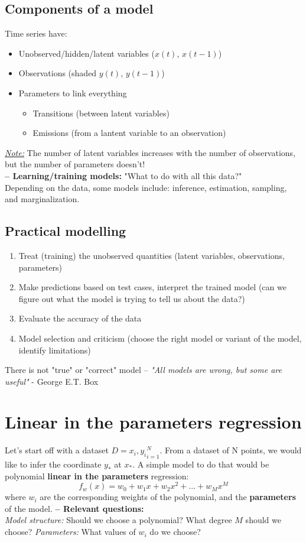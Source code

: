 \documentclass[a4paper,11pt]{article}
\begin{document}
	\subsection{Components of a model}
	Time series have: 
	\begin{itemize}
		\item Unobserved/hidden/latent variables ($x(t)$, $x(t-1)$)
		\item Observations (shaded $y(t)$, $y(t-1)$)
		\item Parameters to link everything 
		\begin{itemize}
			\item Transitions (between latent variables)
			\item Emissions (from a lantent variable to an observation)
		\end{itemize}
	\end{itemize}
	\underline{\emph{Note:}} The number of latent variables increases with the number of observations, but the number of parameters doesn't!\\
	\textbf{-- Learning/training models:} "What to do with all this data?"\\ Depending on the data, some models include: inference, estimation, sampling, and marginalization.
	\subsection{Practical modelling}
	\begin{enumerate}
		\item Treat (training) the unobserved quantities (latent variables, observations, parameters)
		\item Make predictions based on test cases, interpret the trained model (can we figure out what the model is trying to tell us about the data?)
		\item Evaluate the accuracy of the data
		\item Model selection and criticism (choose the right model or variant of the model, identify limitations)
	\end{enumerate}
	There is not "true" or "correct" model -- \emph{"All models are wrong, but some are useful"} - George E.T. Box
	\section{Linear in the parameters regression}
	Let's start off with a dataset $D={x_i,y_i}^N_{i=1}$. From a dataset of N points, we would like to infer the coordinate $y_*$ at $x_*$. A simple model to do that would be polynomial \textbf{linear in the parameters} regression:
	\[f_w(x)=w_0+w_1 x+w_2 x^2+...+w_M x^M\]
	where $w_i$ are the corresponding weights of the polynomial, and the \textbf{parameters} of the model.
	\textbf{-- Relevant questions:}\\
	\emph{Model structure:} Should we choose a polynomial? What degree $M$ should we choose?
	\emph{Parameters:} What values of $w_i$ do we choose?
\end{document}
